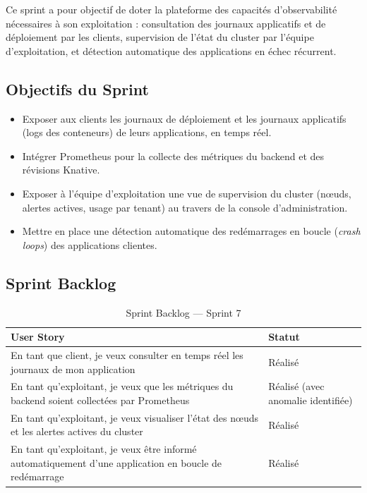 Ce sprint a pour objectif de doter la plateforme des capacités d'observabilité nécessaires à son exploitation : consultation des journaux applicatifs et de déploiement par les clients, supervision de l'état du cluster par l'équipe d'exploitation, et détection automatique des applications en échec récurrent.

\subsection{Objectifs du Sprint}

\begin{itemize}
    \item Exposer aux clients les journaux de déploiement et les journaux applicatifs (logs des conteneurs) de leurs applications, en temps réel.
    \item Intégrer Prometheus pour la collecte des métriques du backend et des révisions Knative.
    \item Exposer à l'équipe d'exploitation une vue de supervision du cluster (nœuds, alertes actives, usage par tenant) au travers de la console d'administration.
    \item Mettre en place une détection automatique des redémarrages en boucle (\textit{crash loops}) des applications clientes.
\end{itemize}

\subsection{Sprint Backlog}

\begin{table}[!ht]
\begin{center}
     \begin{tabular}{|l{11cm}|l{3cm}|}
     \hline
     \textbf{User Story} & \textbf{Statut} \\
     \hline
     En tant que client, je veux consulter en temps réel les journaux de mon application & Réalisé \\
     \hline
     En tant qu'exploitant, je veux que les métriques du backend soient collectées par Prometheus & Réalisé (avec anomalie identifiée) \\
     \hline
     En tant qu'exploitant, je veux visualiser l'état des nœuds et les alertes actives du cluster & Réalisé \\
     \hline
     En tant qu'exploitant, je veux être informé automatiquement d'une application en boucle de redémarrage & Réalisé \\
     \hline
     \end{tabular}
     \caption{Sprint Backlog — Sprint 7}
     \label{tab:sb-sprint7}
     \end{center}
\end{table}

